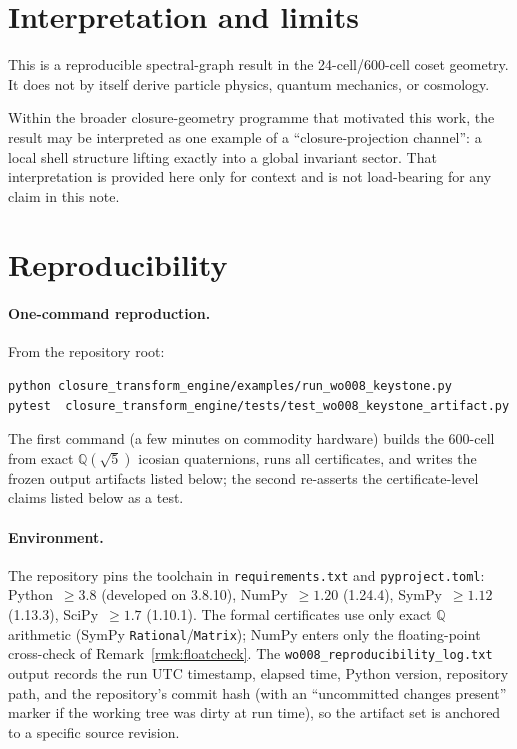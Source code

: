 \documentclass[11pt]{article}
\theoremstyle{plain}
\theoremstyle{definition}
\begin{document}
\section{Interpretation and limits}

This is a reproducible spectral-graph result in the 24-cell/600-cell
coset geometry.  It does not by itself derive particle physics,
quantum mechanics, or cosmology.

\smallskip
\noindent
Within the broader closure-geometry programme that motivated this
work, the result may be interpreted as one example of a
``closure-projection channel'': a local shell structure lifting
exactly into a global invariant sector.  That interpretation is
provided here only for context and is not load-bearing for any claim
in this note.

\section{Reproducibility}\label{sec:repro}

\paragraph{One-command reproduction.}
From the repository root:
\begin{verbatim}
python closure_transform_engine/examples/run_wo008_keystone.py
pytest  closure_transform_engine/tests/test_wo008_keystone_artifact.py
\end{verbatim}
The first command (a few minutes on commodity hardware) builds the
600-cell from exact $\mathbb{Q}(\sqrt5)$ icosian quaternions, runs
all certificates, and writes the frozen output artifacts listed
below; the second re-asserts the certificate-level claims listed
below as a test.

\paragraph{Environment.}
The repository pins the toolchain in \texttt{requirements.txt} and
\texttt{pyproject.toml}: Python~$\ge 3.8$ (developed on 3.8.10),
NumPy~$\ge 1.20$ (1.24.4), SymPy~$\ge 1.12$ (1.13.3), SciPy~$\ge 1.7$
(1.10.1).  The formal certificates use only exact $\mathbb{Q}$
arithmetic (SymPy \texttt{Rational}/\texttt{Matrix}); NumPy enters
only the floating-point cross-check of Remark~\ref{rmk:floatcheck}.
The \texttt{wo008\_reproducibility\_log.txt} output records the run
UTC timestamp, elapsed time, Python version, repository path, and
the repository's commit hash (with an
``uncommitted changes present'' marker if the working tree was dirty
at run time), so the artifact set is anchored to a specific source
revision.
\end{document}

